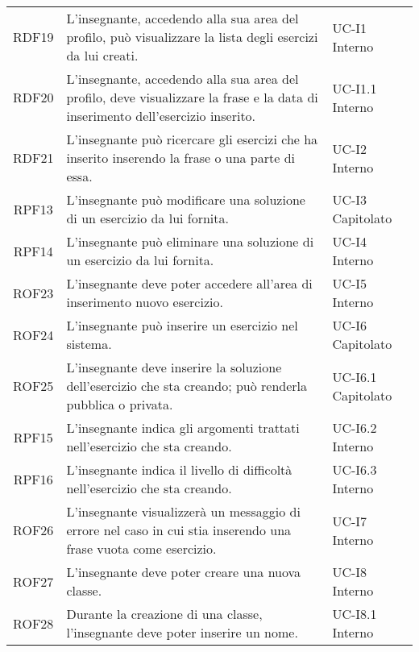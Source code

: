 \begin{tabularx}{\textwidth}{| c | p{10cm} | X |}
		RDF19 & L'insegnante, accedendo alla sua area del profilo, può visualizzare la lista degli esercizi da lui creati. & UC-I1 \newline Interno\\
		RDF20 & L'insegnante, accedendo alla sua area del profilo, deve visualizzare la frase e la data di inserimento dell'esercizio inserito. & UC-I1.1 \newline Interno\\
		RDF21 & L'insegnante può ricercare gli esercizi che ha inserito inserendo la frase o una parte di essa. & UC-I2 \newline Interno\\
		RPF13 & L'insegnante può modificare una soluzione di un esercizio da lui fornita. & UC-I3 \newline Capitolato\\
		RPF14 & L'insegnante può eliminare una soluzione di un esercizio da lui fornita. & UC-I4 \newline Interno\\
		ROF23 & L'insegnante deve poter accedere all'area di inserimento nuovo esercizio. & UC-I5 \newline Interno\\		
		ROF24 & L'insegnante può inserire un esercizio nel sistema. & UC-I6 \newline Capitolato\\
		ROF25 & L'insegnante deve inserire la soluzione dell'esercizio che sta creando; può renderla pubblica o privata. & UC-I6.1 \newline Capitolato\\
		RPF15 & L'insegnante indica gli argomenti trattati nell'esercizio che sta creando. & UC-I6.2 \newline Interno\\
		RPF16 & L'insegnante indica il livello di difficoltà nell'esercizio che sta creando. & UC-I6.3 \newline Interno\\
		ROF26 & L'insegnante visualizzerà un messaggio di errore nel caso in cui stia inserendo una frase vuota come esercizio. & UC-I7 \newline Interno\\
		ROF27 & L'insegnante deve poter creare una nuova classe. & UC-I8 \newline Interno\\
		ROF28 & Durante la creazione di una classe, l'insegnante deve poter inserire un nome. & UC-I8.1 \newline Interno\\

\end{tabularx}
